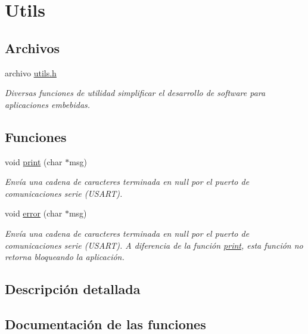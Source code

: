 \hypertarget{group__utils}{}\section{Utils}
\label{group__utils}
\subsection*{Archivos}
\begin{DoxyCompactItemize}
\item 
archivo \hyperlink{utils_8h}{utils.\+h}
\begin{DoxyCompactList}\small\item\em Diversas funciones de utilidad simplificar el desarrollo de software para aplicaciones embebidas. \end{DoxyCompactList}\end{DoxyCompactItemize}
\subsection*{Funciones}
\begin{DoxyCompactItemize}
\item 
void \hyperlink{group__utils_gad024a1e5d48fcc72b6befd262d03791a}{print} (char $\ast$msg)
\begin{DoxyCompactList}\small\item\em Envía una cadena de caracteres terminada en null por el puerto de comunicaciones serie (U\+S\+A\+RT). \end{DoxyCompactList}\item 
void \hyperlink{group__utils_gaad9796c174f7ef5d226cd169f2520fd5}{error} (char $\ast$msg)
\begin{DoxyCompactList}\small\item\em Envía una cadena de caracteres terminada en null por el puerto de comunicaciones serie (U\+S\+A\+RT). A diferencia de la función \hyperlink{group__utils_gad024a1e5d48fcc72b6befd262d03791a}{print}, esta función no retorna bloqueando la aplicación. \end{DoxyCompactList}\end{DoxyCompactItemize}


\subsection{Descripción detallada}


\subsection{Documentación de las funciones}
